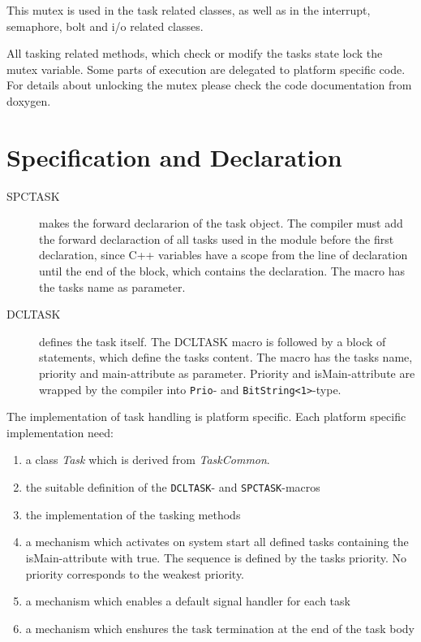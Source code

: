 \begin{description}
This mutex is used in the task related classes, as well as in the interrupt,
semaphore, bolt and i/o related classes. 

All tasking related methods, which check or modify  the tasks state lock the 
mutex variable. Some parts of execution are delegated to platform specific
code. For details about unlocking the mutex please check the code
documentation from doxygen.



\section{Specification and Declaration}
\begin{description}
\item[SPCTASK] makes the forward declararion of the task object.
    The compiler must add the forward declaraction of all tasks
    used in the module before the first declaration, since C++
    variables have a scope from the line of declaration until 
    the end of the block, which contains the declaration.
    The macro has the tasks name as parameter.
\item[DCLTASK] defines the task itself. The DCLTASK macro is followed
    by a block of statements, which define the tasks content.
    The macro has the tasks name, priority and main-attribute as
    parameter. 
    Priority and isMain-attribute are wrapped by the compiler 
    into \verb|Prio|- and \verb|BitString<1>|-type.
\end{description}

The implementation of task handling is platform specific.
Each platform specific implementation need:
\begin{enumerate}
\item  a class {\em Task} which is derived from {\em TaskCommon}.
\item the suitable definition of the \verb|DCLTASK|- and \verb|SPCTASK|-macros
\item the implementation of the tasking methods
\item a mechanism which activates on system start
   all defined tasks containing the isMain-attribute with true. 
   The sequence is defined by the tasks priority. 
   No priority corresponds to the weakest priority.
\item a mechanism which enables a default signal handler for each task
\item a mechanism which enshures the task termination at the end of
   the task body
\end{enumerate}


\end{description}
